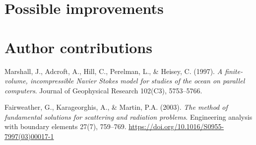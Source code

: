 \documentclass{article}
\begin{document}
	\section{Possible improvements}
	
	\section{Author contributions}
	
	\begin{thebibliography}{9}
		Marshall, J., Adcroft, A., Hill, C., Perelman, L., \& Heisey, C.
		(1997).
		\emph{A finite-volume, incompressible Navier Stokes model for studies of the ocean on parallel computers}.
		Journal of Geophysical Research 
		102(C3), 5753--5766.
		
		Fairweather, G., Karageorghis, A., \& Martin, P.A.
		(2003).
		\emph{The method of fundamental solutions for scattering and radiation problems}.
		Engineering analysis with boundary elements   
		27(7), 759--769.
		\url{https://doi.org/10.1016/S0955-7997(03)00017-1}
		
	\end{thebibliography}
\end{document}
